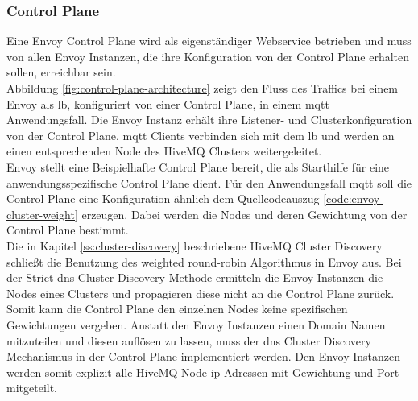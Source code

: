 \subsubsection{Control Plane} \label{ss:control-plane}
Eine Envoy Control Plane wird als eigenständiger Webservice betrieben und muss von allen Envoy Instanzen, die ihre Konfiguration von der Control Plane erhalten sollen, erreichbar sein.
\\
Abbildung \ref{fig:control-plane-architecture} zeigt den Fluss des Traffics bei einem Envoy als \acl{lb}, konfiguriert von einer Control Plane, in einem \ac{mqtt} Anwendungsfall. Die Envoy Instanz erhält ihre Listener- und Clusterkonfiguration von der Control Plane. \ac{mqtt} Clients verbinden sich mit dem \ac{lb} und werden an einen entsprechenden Node des HiveMQ Clusters weitergeleitet.
\\
Envoy stellt eine Beispielhafte Control Plane \cite{DynamicConfigurationControl} bereit, die als Starthilfe für eine anwendungsspezifische Control Plane dient. Für den Anwendungsfall \ac{mqtt} soll die Control Plane eine Konfiguration ähnlich dem Quellcodeauszug \ref{code:envoy-cluster-weight} erzeugen. Dabei werden die Nodes und deren Gewichtung von der Control Plane bestimmt.
\\
Die in Kapitel \ref{ss:cluster-discovery} beschriebene HiveMQ Cluster Discovery schlie{\ss}t die Benutzung des weighted round-robin Algorithmus in Envoy aus.
Bei der Strict \ac{dns} Cluster Discovery Methode ermitteln die Envoy Instanzen die Nodes eines Clusters und propagieren diese nicht an die Control Plane zurück. Somit kann die Control Plane den einzelnen Nodes keine spezifischen Gewichtungen vergeben.
Anstatt den Envoy Instanzen einen Domain Namen mitzuteilen und diesen auflösen zu lassen, muss der \ac{dns} Cluster Discovery Mechanismus in der Control Plane implementiert werden. Den Envoy Instanzen werden somit explizit alle HiveMQ Node \ac{ip} Adressen mit Gewichtung und Port mitgeteilt.
